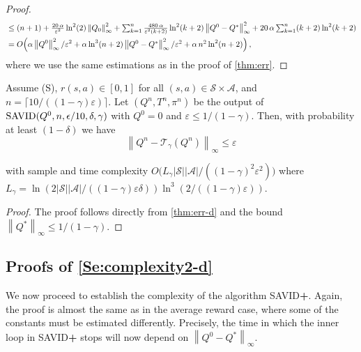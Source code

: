 \documentclass{article}
\newcommand{\cA}{\mathcal{A}}
\newcommand{\cS}{\mathcal{S}}
\newcommand{\T}{\mathcal{T}}
\newcommand*{\infn}[1]{\left\|{#1}\right\|_{\infty}}
\newenvironment{manualtheorem}[1]{%
    \renewcommand\themanualtheoreminner{#1}%
  \manualtheoreminner
}{\endmanualtheoreminner}
\theoremstyle{plain}
\theoremstyle{definition}
\theoremstyle{remark}
\begin{document}
\begin{proof}
\begin{align}
      &\leq\mbox{$ (n+1)+\frac{20\, \alpha}{\varepsilon^{2}} \ln^2(2)\infn{Q_0}^2+\sum_{k=1}^n\frac{480\,\alpha}{\varepsilon^{2}(k+2)}\ln^2(k+2)\infn{Q^0-Q^*}^2+20\,\alpha\sum_{k=1}^n(k+2)\ln^2(k+2)$} \nonumber\\
   &=O\!\left( \alpha \infn{Q^0}^2/\varepsilon^{2}+\mbox{$\alpha\ln^3(n+2)\infn{Q^0-Q^*}^2/\varepsilon^{2}+\alpha \,n^2\ln^2(n+2)$}\right),
   \label{eq:last-d}
\end{align}
where we use the same estimations as in the proof of \cref{thm:err}.
\end{proof}

\begin{manualtheorem}{4.2}
   Assume \mbox{\sc (S)}, $ r(s,a) \in [0,1]$ for all $(s,a)\in\cS\times \cA$, and $n\!=\!\lceil{10/((1\!-\!\gamma)\varepsilon)}\rceil$. Let $(Q^n,T^n,\pi^n)$ be the output of $ \mbox{\rm SAVID}(Q^0,n, \epsilon/10, \delta, \gamma)$ with $Q^0=0$ and $\varepsilon \le 1/(1\!-\!\gamma)$. Then, with probability at least $(1-\delta)$ we have
\vspace{-1ex}
  $$ \infn{Q^n-\T_\gamma(Q^n)}\leq \varepsilon$$
 
  \vspace{-2ex}
   with sample and time complexity ${O}\big(L_{\gamma}|\cS||\cA|/((1\!-\!\gamma)^2\varepsilon^{2})\big)$
   where $L_{\gamma}=\ln (2|\cS||\cA|/((1\!-\!\gamma)\varepsilon \delta))\ln^3 (2/((1\!-\!\gamma)\varepsilon)) $.
\end{manualtheorem}
\begin{proof}
   The proof follows directly  from  \cref{thm:err-d} and the bound $\infn{Q^*} \le 1/(1\!-\!\gamma)$.
\end{proof}

\subsection{Proofs of \cref{Se:complexity2-d}}
We now proceed to establish the complexity of the algorithm \mbox{\rm SAVID\textbf{+}}. Again, the proof is almost the same as in the average reward case, where some of the constants must be estimated differently. Precisely, the time in which the inner loop in \mbox{\rm SAVID\textbf{+}} stops will now depend on $\infn{Q^0 - Q^*}$. 
\end{document}
